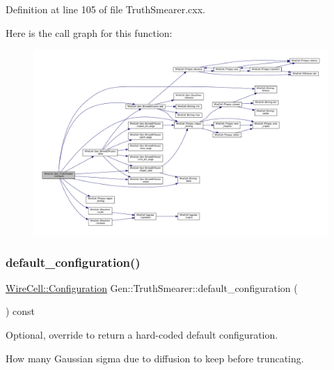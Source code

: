Definition at line 105 of file Truth\+Smearer.\+cxx.

Here is the call graph for this function\+:
\nopagebreak
\begin{figure}[H]
\begin{center}
\leavevmode
\includegraphics[width=350pt]{class_wire_cell_1_1_gen_1_1_truth_smearer_a75e03e4110e01b8ff31ad3aba5e7804d_cgraph}
\end{center}
\end{figure}
\mbox{\label{class_wire_cell_1_1_gen_1_1_truth_smearer_a9ba841f3a493bb16e41d87e69448843c}} 
\subsubsection{\texorpdfstring{default\+\_\+configuration()}{default\_configuration()}}
{\footnotesize\ttfamily \hyperlink{namespace_wire_cell_a9f705541fc1d46c608b3d32c182333ee}{Wire\+Cell\+::\+Configuration} Gen\+::\+Truth\+Smearer\+::default\+\_\+configuration (\begin{DoxyParamCaption}{ }\end{DoxyParamCaption}) const\hspace{0.3cm}{\ttfamily [virtual]}}



Optional, override to return a hard-\/coded default configuration. 

How many Gaussian sigma due to diffusion to keep before truncating.

